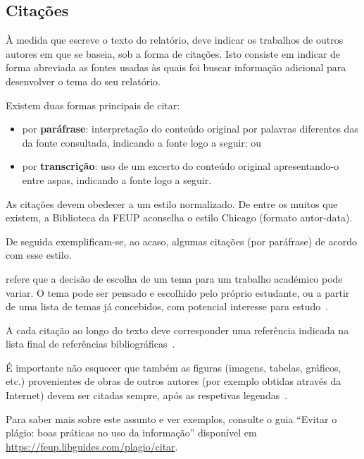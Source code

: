 
\subsection*{Citações}

À medida que escreve o texto do relatório, deve indicar os trabalhos
de outros autores em que se baseia, sob a forma de citações.
Isto consiste em indicar de forma abreviada as fontes usadas às quais
foi buscar informação adicional para desenvolver o tema do seu
relatório.

Existem duas formas principais de citar:
\begin{itemize}
\item por \textbf{paráfrase}: interpretação do conteúdo original por
  palavras diferentes das da fonte consultada, indicando a fonte logo
  a seguir; ou 
\item 
  por \textbf{transcrição}: uso de um excerto do conteúdo original
  apresentando-o entre aspas, indicando a fonte logo a seguir.
\end{itemize}

As citações devem obedecer a um estilo normalizado.
De entre os muitos que existem, a Biblioteca da FEUP aconselha o
estilo Chicago (formato autor-data).

\begin{info}
De seguida exemplificam-se, ao acaso, algumas citações (por paráfrase)
de acordo com esse estilo.
\end{info}

\textcite{kn:Bel02-book} refere que a decisão de escolha de um tema 
para um trabalho académico pode variar.
O tema pode ser pensado e escolhido pelo próprio estudante, ou a
partir de uma lista de temas já concebidos, com potencial interesse
para estudo~\parencite{kn:GLPR14-joPhysics}.

A cada citação ao longo do texto deve corresponder uma referência
indicada na lista final de referências
bibliográficas~\parencite{kn:Lip08,kn:MSS+12-wemep,kn:VKL+18-dtu}. 

É importante não esquecer que também as figuras (imagens, tabelas,
gráficos, etc.) provenientes de obras de outros autores (por exemplo 
obtidas através da Internet) devem ser citadas sempre, após as
respetivas legendas~\parencite{kn:GLPC22-torque}.

Para saber mais sobre este assunto e ver exemplos, consulte o guia
``Evitar o plágio: boas práticas no uso da informação'' disponível 
em \url{https://feup.libguides.com/plagio/citar}.  

